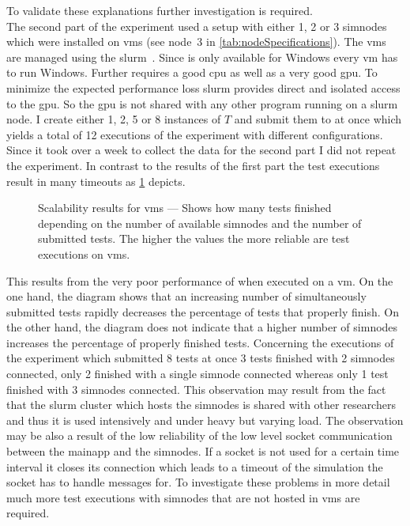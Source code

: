To validate these explanations further investigation is required.\\
The second part of the experiment used a setup with either \num{1}, \num{2} or \num{3} \gls{simnode}\unskip{}s which were installed on \glspl{vm} (see node~3 in \cref{tab:nodeSpecifications}).
The \glspl{vm} are managed using the \gls{slurm}~\cite{slurm}.
Since \beamng{} is only available for Windows every \gls{vm} has to run Windows.
Further \beamng{} requires a good \gls{cpu} as well as a very good \gls{gpu}.
To minimize the expected performance loss \gls{slurm} provides direct and isolated access to the \gls{gpu}.
So the \gls{gpu} is not shared with any other program running on a \gls{slurm} node.
I create either \num{1}, \num{2}, \num{5} or \num{8} instances of \(T\) and submit them to \drivebuild{} at once which yields a total of \num{12} executions of the experiment with different configurations.
Since it took over a week to collect the data for the second part I did not repeat the experiment.
In contrast to the results of the first part the test executions result in many timeouts as \cref{fig:scalabilityResults} depicts.
\begin{figure}
    
    \medskip
    \caption{%
        Scalability results for \glspl{vm} --- Shows how many tests finished depending on the number of available \glspl{simnode} and the number of submitted tests.
        The higher the values the more reliable are test executions on \glspl{vm}.
    }\label{fig:scalabilityResults}
\end{figure}
This results from the very poor performance of \beamng{} when executed on a \gls{vm}.
On the one hand, the diagram shows that an increasing number of simultaneously submitted tests rapidly decreases the percentage of tests that properly finish.
On the other hand, the diagram does not indicate that a higher number of \glspl{simnode} increases the percentage of properly finished tests.
Concerning the executions of the experiment which submitted \num{8} tests at once \num{3} tests finished with \num{2} \glspl{simnode} connected, only \num{2} finished with a single \gls{simnode} connected whereas only \num{1} test finished with \num{3} \glspl{simnode} connected.
This observation may result from the fact that the \gls{slurm} cluster which hosts the \glspl{simnode} is shared with other researchers and thus it is used intensively and under heavy but varying load.
The observation may be also a result of the low reliability of the low level socket communication between the \gls{mainapp} and the \glspl{simnode}.
If a socket is not used for a certain time interval it closes its connection which leads to a timeout of the simulation the socket has to handle messages for.
To investigate these problems in more detail much more test executions with \glspl{simnode} that are not hosted in \glspl{vm} are required.

